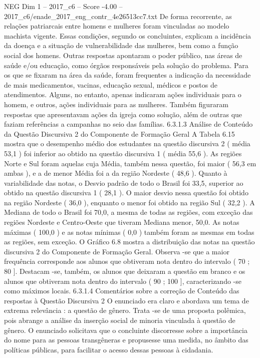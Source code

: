 \begin{textsample}{NEG Dim 1 – 2017\_c6 – Score -4.00 – 2017\_c6/enade\_2017\_eng\_contr\_4e26513cc7.txt}
De forma recorrente, as relações patriarcais entre homens e mulheres foram vinculadas ao modelo machista vigente.
Essas condições, segundo os concluintes, explicam a incidência da doença e a situação de vulnerabilidade das mulheres, bem como a função social dos homens.
Outras respostas apontaram o poder público, nas áreas de saúde e/ou educação, como órgãos responsáveis pela solução do problema.
Para os que se fixaram na área da saúde, foram frequentes a indicação da necessidade de mais medicamentos, vacinas, educação sexual, médicos e postos de atendimentos.
Alguns, no entanto, apenas indicaram ações individuais para o homem, e outros, ações individuais para as mulheres.
Também figuraram respostas que apresentavam ações da igreja como solução, além de outras que faziam referências a campanhas no seio das famílias. 6.3.1.3 Análise de Conteúdo da Questão Discursiva 2 do Componente de Formação Geral A Tabela 6.15 mostra que o desempenho médio dos estudantes na questão discursiva 2 ( média 53,1 ) foi inferior ao obtido na questão discursiva 1 ( média 55,6 ).
As regiões Norte e Sul foram aquelas cuja Média, também nessa questão, foi maior ( 56,3 em ambas ), e a de menor Média foi a da região Nordeste ( 48,6 ).
Quanto à variabilidade das notas, o Desvio padrão de todo o Brasil foi 33,5, superior ao obtido na questão discursiva 1 ( 28,1 ).
O maior desvio nessa questão foi obtido na região Nordeste ( 36,0 ), enquanto o menor foi obtido na região Sul ( 32,2 ).
A Mediana de todo o Brasil foi 70,0, a mesma de todas as regiões, com exceção das regiões Nordeste e Centro-Oeste que tiveram Mediana menor, 50,0.
As notas máximas ( 100,0 ) e as notas mínimas ( 0,0 ) também foram as mesmas em todas as regiões, sem exceção.
O Gráfico 6.8 mostra a distribuição das notas na questão discursiva 2 do Componente de Formação Geral.
Observa -se que a maior frequência corresponde aos alunos que obtiveram nota dentro do intervalo ( 70 ; 80 ].
Destacam -se, também, os alunos que deixaram a questão em branco e os alunos que obtiveram nota dentro do intervalo ( 90 ; 100 ], caracterizando -se como máximos locais. 6.3.1.4 Comentários sobre a correção de Conteúdo das respostas à Questão Discursiva 2 O enunciado era claro e abordava um tema de extrema relevância : a questão de gênero.
Trata -se de uma proposta polêmica, pois abrange a análise da inserção social de minoria vinculada à questão de gênero.
O enunciado solicitava que o concluinte discorresse sobre a importância do nome para as pessoas transgêneras e propusesse uma medida, no âmbito das políticas públicas, para facilitar o acesso dessas pessoas à cidadania.

\end{textsample}
